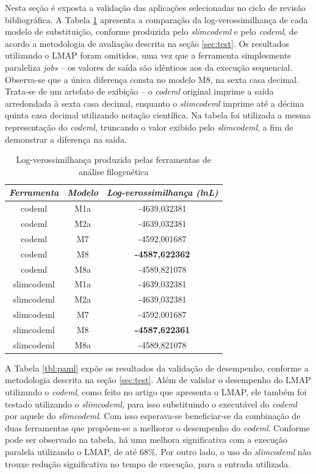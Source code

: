 \documentclass[cic,tc]{iiufrgs}
\begin{document}
Nesta seção é exposta a validação das aplicações selecionadas no ciclo de
revisão bibliográfica. A Tabela \ref{tbl:log} apresenta a comparação da
log-verossimilhança de cada modelo de substituição, conforme produzida pelo
\textit{slimcodeml} e pelo \textit{codeml}, de acordo a metodologia de
avaliação descrita na seção \ref{sec:test}. Os resultados utilizando o LMAP
foram omitidos, uma vez que a ferramenta simplesmente paraleliza \textit{jobs}
-- os valores de saída são idênticos aos da execução sequencial. Observa-se que
a única diferença consta no modelo M8, na sexta casa decimal. Trata-se de um
artefato de exibição -- o \textit{codeml} original imprime a saída arredondada
à sexta casa decimal, enquanto o \textit{slimcodeml} imprime até a décima
quinta casa decimal utilizando notação científica. Na tabela foi utilizada a
mesma representação do \textit{codeml}, truncando o valor exibido pelo
\textit{slimcodeml}, a fim de demonstrar a diferença na saída. 

\begin{table}[h]
    \caption{Log-verossimilhança produzida pelas ferramentas de análise filogenética}
    \centering
        \begin{tabular}{c|c|c}
          \hline
          \textit{Ferramenta}  &   \textit{Modelo} & \textit{Log-verossimilhança (lnL)} \\
          \hline
          \hline
          codeml            & M1a & -4639,032381 \\
          codeml            & M2a & -4639,032381 \\
          codeml            & M7  & -4592,001687 \\
          codeml            & M8  & \textbf{-4587,622362} \\
          codeml            & M8a & -4589,821078 \\
          slimcodeml        & M1a & -4639,032381 \\
          slimcodeml        & M2a & -4639,032381 \\
          slimcodeml        & M7  & -4592,001687 \\
          slimcodeml        & M8  & \textbf{-4587,622361} \\
          slimcodeml        & M8a & -4589,821078 \\
          \hline
        \end{tabular}
    \label{tbl:log}
\end{table}

A Tabela \ref{tbl:paml} expõe os resultados da validação de desempenho,
conforme a metodologia descrita na seção \ref{sec:test}. Além de validar o
desempenho do LMAP utilizando o \textit{codeml}, como feito no artigo que
apresenta o LMAP, ele também foi testado utilizando o \textit{slimcodeml}, para
isso substituindo o executável do \textit{codeml} por aquele do
\textit{slimcodeml}. Com isso esperava-se beneficiar-se da combinação de duas
ferramentas que propõem-se a melhorar o desempenho do \textit{codeml}.
Conforme pode ser observado na tabela, há uma melhora significativa com a
execução paralela utilizando o LMAP, de até 68\%. Por outro lado, o uso do
\textit{slimcodeml} não trouxe redução significativa no tempo de execução, para
a entrada utilizada.
\end{document}
